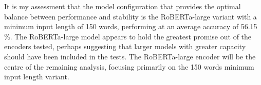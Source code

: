 \documentclass[12pt]{report}
\begin{document}

It is my assessment that the model configuration that provides the optimal balance between performance and stability is the RoBERTa-large variant with a minimum input length of 150 words, performing at an average accuracy of 56.15 \%.
The RoBERTa-large model appears to hold the greatest promise out of the encoders tested, perhaps suggesting that larger models with greater capacity should have been included in the tests.
The RoBERTa-large encoder will be the centre of the remaining analysis, focusing primarily on the 150 words minimum input length variant.
\end{document}
